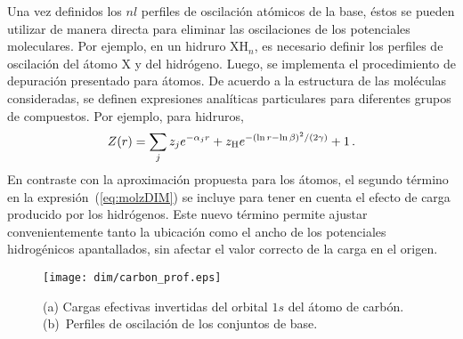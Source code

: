 Una vez definidos los $nl$ perfiles de oscilación atómicos de la base, 
éstos se pueden utilizar de manera directa para eliminar las 
oscilaciones de los potenciales
moleculares. Por ejemplo, en un hidruro XH$_n$, es necesario definir los 
perfiles de oscilación del átomo X y del hidrógeno. Luego, se implementa 
el procedimiento de depuración presentado para átomos. De acuerdo a la 
estructura de las moléculas consideradas, se definen expresiones 
analíticas particulares para diferentes grupos de compuestos. Por 
ejemplo, para hidruros,
\begin{eqnarray}
 Z(r) = \sum_j z_j e^{-\alpha_j r} 
 + z_{\mbox{\scriptsize H}} e^{-(\ln r - \ln \beta)^2/(2\gamma)} 
 + 1\,.
 \label{eq:molzDIM}
\end{eqnarray}
En contraste con la aproximación propuesta para los átomos, el segundo 
término en la expresión~(\ref{eq:molzDIM}) se incluye para tener en 
cuenta el efecto de carga producido por los hidrógenos. Este nuevo 
término permite ajustar convenientemente tanto la ubicación como el 
ancho de los potenciales hidrogénicos apantallados, sin afectar el valor 
correcto de la carga en el origen.

\begin{figure}[t]
\centering
\texttt{[image: dim/carbon\_prof.eps]}
\caption[Inversión de orbitales descriptos con conjuntos de base 
finitos.]
{(a) Cargas efectivas invertidas del orbital $1s$ del átomo de carbón.
(b)~Perfiles de oscilación de los conjuntos de base.}
\label{fig:1sCarbon}
\end{figure}


